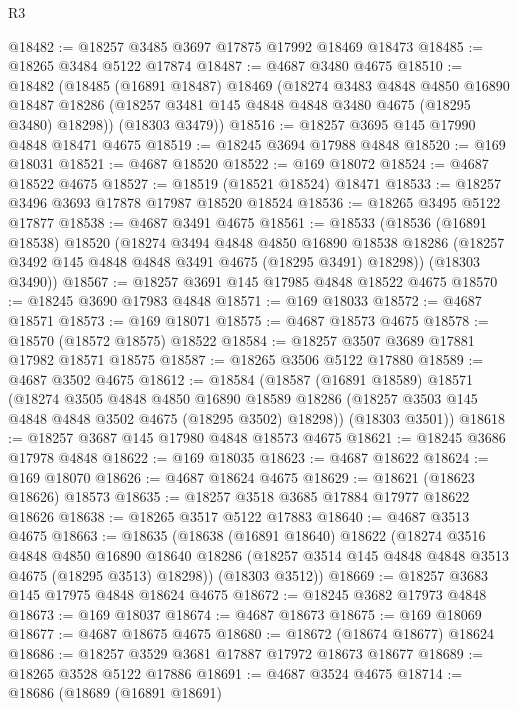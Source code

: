 \begin{lexlean}{R3}
\begin{coremodule}
@18482 := @18257 @3485 @3697 @17875 @17992 @18469 @18473
@18485 := @18265 @3484 @5122 @17874
@18487 := @4687 @3480 @4675
@18510 := @18482
    (@18485
      (@16891 @18487)
      @18469
      (@18274
        @3483
        @4848
        @4850
        @16890
        @18487
        @18286
        (@18257 @3481 @145 @4848 @4848 @3480 @4675 (@18295 @3480) @18298))
      (@18303 @3479))
@18516 := @18257 @3695 @145 @17990 @4848 @18471 @4675
@18519 := @18245 @3694 @17988 @4848
@18520 := @169 @18031
@18521 := @4687 @18520
@18522 := @169 @18072
@18524 := @4687 @18522 @4675
@18527 := @18519 (@18521 @18524) @18471
@18533 := @18257 @3496 @3693 @17878 @17987 @18520 @18524
@18536 := @18265 @3495 @5122 @17877
@18538 := @4687 @3491 @4675
@18561 := @18533
    (@18536
      (@16891 @18538)
      @18520
      (@18274
        @3494
        @4848
        @4850
        @16890
        @18538
        @18286
        (@18257 @3492 @145 @4848 @4848 @3491 @4675 (@18295 @3491) @18298))
      (@18303 @3490))
@18567 := @18257 @3691 @145 @17985 @4848 @18522 @4675
@18570 := @18245 @3690 @17983 @4848
@18571 := @169 @18033
@18572 := @4687 @18571
@18573 := @169 @18071
@18575 := @4687 @18573 @4675
@18578 := @18570 (@18572 @18575) @18522
@18584 := @18257 @3507 @3689 @17881 @17982 @18571 @18575
@18587 := @18265 @3506 @5122 @17880
@18589 := @4687 @3502 @4675
@18612 := @18584
    (@18587
      (@16891 @18589)
      @18571
      (@18274
        @3505
        @4848
        @4850
        @16890
        @18589
        @18286
        (@18257 @3503 @145 @4848 @4848 @3502 @4675 (@18295 @3502) @18298))
      (@18303 @3501))
@18618 := @18257 @3687 @145 @17980 @4848 @18573 @4675
@18621 := @18245 @3686 @17978 @4848
@18622 := @169 @18035
@18623 := @4687 @18622
@18624 := @169 @18070
@18626 := @4687 @18624 @4675
@18629 := @18621 (@18623 @18626) @18573
@18635 := @18257 @3518 @3685 @17884 @17977 @18622 @18626
@18638 := @18265 @3517 @5122 @17883
@18640 := @4687 @3513 @4675
@18663 := @18635
    (@18638
      (@16891 @18640)
      @18622
      (@18274
        @3516
        @4848
        @4850
        @16890
        @18640
        @18286
        (@18257 @3514 @145 @4848 @4848 @3513 @4675 (@18295 @3513) @18298))
      (@18303 @3512))
@18669 := @18257 @3683 @145 @17975 @4848 @18624 @4675
@18672 := @18245 @3682 @17973 @4848
@18673 := @169 @18037
@18674 := @4687 @18673
@18675 := @169 @18069
@18677 := @4687 @18675 @4675
@18680 := @18672 (@18674 @18677) @18624
@18686 := @18257 @3529 @3681 @17887 @17972 @18673 @18677
@18689 := @18265 @3528 @5122 @17886
@18691 := @4687 @3524 @4675
@18714 := @18686
    (@18689
      (@16891 @18691)

\end{coremodule}
\end{lexlean}
